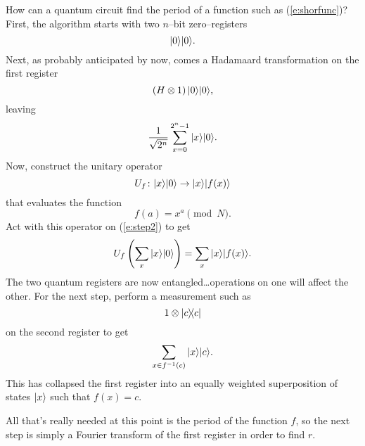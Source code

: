 How can a quantum circuit find the period of a function
such as (\ref{e:shorfunc})?  First, the algorithm starts
with two $n$--bit zero--registers
\begin{equation}
{|{0}\rangle}{|{0}\rangle}.
\end{equation}
Next, as probably anticipated by now, comes a Hadamaard
transformation on the first register 
\begin{equation}
\left( H\otimes 1 \right) {|{0}\rangle}{|{0}\rangle},
\end{equation}
leaving
\begin{equation}
\frac{1}{\sqrt{2^n}}\sum_{x=0}^{2^n-1} {|{x}\rangle}{|{0}\rangle}.
\label{e:step2}
\end{equation}
Now, construct the unitary operator
\begin{equation}
U_f\colon{|{x}\rangle}{|{0}\rangle}\to{|{x}\rangle}{|{f(x)}\rangle}
\end{equation}
that evaluates the function
\begin{equation}
f(a) = x^a\pmod{N}.
\end{equation}
Act with this operator on (\ref{e:step2}) to get
\begin{equation}
U_f \left( \sum_{x} {|{x}\rangle}{|{0}\rangle} \right)
= \sum_{x} {|{x}\rangle}{|{f(x)}\rangle}.
\end{equation}
The two quantum registers are now entangled\dots operations on
one will affect the other.  For the next step, 
perform a measurement such as
\begin{equation}
1\otimes {|{c}\rangle\!\langle{c}|}
\end{equation}
on the second register to get
\begin{equation}
\sum_{x\in f^{-1}(c)} {|{x}\rangle}{|{c}\rangle}.
\label{e:shorB}
\end{equation}
This has collapsed the first register into an equally weighted
superposition of states ${|{x}\rangle}$ such that $f(x) = c$.  

All that's really needed at this point is the period of the function
$f$, so the next step is simply a Fourier transform of the first 
register in order to find $r$.  

